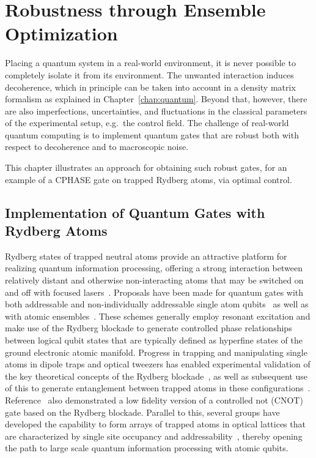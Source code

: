 \chapter{Robustness through Ensemble Optimization}
\label{chap:robust}

Placing a quantum system in a real-world environment, it is never possible to
completely isolate it from its environment. The unwanted interaction induces
decoherence, which in principle can be taken into account in a density matrix
formalism as explained in Chapter~\ref{chap:quantum}.
Beyond that, however, there are also imperfections, uncertainties, and
fluctuations in the classical parameters of the experimental setup, e.g.\ the
control field. The challenge of real-world quantum computing is to implement
quantum gates that are robust both with respect to decoherence and to
macroscopic noise.

This chapter illustrates an approach for obtaining such robust gates, for an
example of a CPHASE gate on trapped Rydberg atoms, via optimal control. 


\section{Implementation of Quantum Gates with Rydberg Atoms}

Rydberg states of trapped neutral atoms provide an attractive platform for
realizing quantum information processing, offering a strong interaction between
relatively distant and otherwise non-interacting atoms that may be switched on
and off with focused lasers~\cite{SaffmanRMP10}.  Proposals have been made for
quantum gates with both addressable and non-individually addressable single atom
qubits~\cite{JakschPRL00} as well as with atomic
ensembles~\cite{lukin2001dipole,beterov2013quantum}.  These schemes
generally 
employ resonant excitation and make use of the Rydberg blockade to generate
controlled phase relationships between logical qubit states that are typically
defined as hyperfine states of the ground electronic atomic manifold.  Progress
in trapping and manipulating single atoms in dipole traps and optical tweezers
has enabled experimental validation of the key theoretical concepts of the
Rydberg blockade~\cite{UrbanNatPhys09,GaetanNatPhys2009}, as well as subsequent
use of this to generate entanglement between trapped atoms in these
configurations~\cite{WilkPRL10,IsenhowerPRL10}. Reference~\cite{IsenhowerPRL10}
also 
demonstrated a low fidelity version of a controlled not (CNOT) gate based on the
Rydberg blockade.  Parallel to this, several groups have developed the
capability to form arrays of trapped atoms in optical lattices that are
characterized by single site occupancy and
addressability~\cite{bergamini2004holographic,nelson2007imaging,whitlock2009two,bakr2009quantum,kruse2010reconfigurable,weitenberg2011single,PhysRevA.89.030301},
thereby opening the path to large scale quantum information processing with
atomic qubits.

